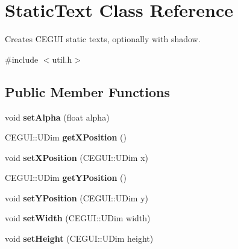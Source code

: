 \hypertarget{classStaticText}{
\section{\-Static\-Text \-Class \-Reference}
\label{d0/d4a/classStaticText}
}


\-Creates \-C\-E\-G\-U\-I static texts, optionally with shadow.  




{\ttfamily \#include $<$util.\-h$>$}

\subsection*{\-Public \-Member \-Functions}
\begin{DoxyCompactItemize}
\item 
\hypertarget{classStaticText_a1ca192cc317818cac3e798787f789b07}{
void {\bfseries set\-Alpha} (float alpha)}
\label{d0/d4a/classStaticText_a1ca192cc317818cac3e798787f789b07}

\item 
\hypertarget{classStaticText_aac601a001b516c333edb5ef7d76dcb9f}{
\-C\-E\-G\-U\-I\-::\-U\-Dim {\bfseries get\-X\-Position} ()}
\label{d0/d4a/classStaticText_aac601a001b516c333edb5ef7d76dcb9f}

\item 
\hypertarget{classStaticText_a46be1c8fd36b0ac4b7c2545c663ed498}{
void {\bfseries set\-X\-Position} (\-C\-E\-G\-U\-I\-::\-U\-Dim x)}
\label{d0/d4a/classStaticText_a46be1c8fd36b0ac4b7c2545c663ed498}

\item 
\hypertarget{classStaticText_a6f10d098faee38eb15f9a22d93eb6b6b}{
\-C\-E\-G\-U\-I\-::\-U\-Dim {\bfseries get\-Y\-Position} ()}
\label{d0/d4a/classStaticText_a6f10d098faee38eb15f9a22d93eb6b6b}

\item 
\hypertarget{classStaticText_abe44725e9b563fbc6e1fbe6df2800e72}{
void {\bfseries set\-Y\-Position} (\-C\-E\-G\-U\-I\-::\-U\-Dim y)}
\label{d0/d4a/classStaticText_abe44725e9b563fbc6e1fbe6df2800e72}

\item 
\hypertarget{classStaticText_ac83d482b2023c2ba8bc5e4377fcaa4aa}{
void {\bfseries set\-Width} (\-C\-E\-G\-U\-I\-::\-U\-Dim width)}
\label{d0/d4a/classStaticText_ac83d482b2023c2ba8bc5e4377fcaa4aa}

\item 
\hypertarget{classStaticText_a190e9c1ba9322ac397df1d0587f61256}{
void {\bfseries set\-Height} (\-C\-E\-G\-U\-I\-::\-U\-Dim height)}
\label{d0/d4a/classStaticText_a190e9c1ba9322ac397df1d0587f61256}


\end{DoxyCompactItemize}
